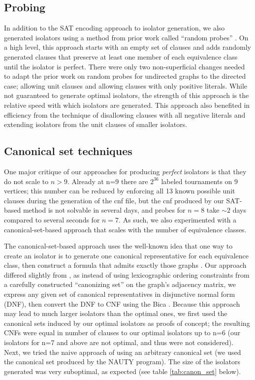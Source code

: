 \documentclass[conference]{IEEEtran}
\begin{document}
\subsection{Probing}
In addition to the SAT encoding approach to isolator generation, we also generated isolators using a method from prior work called ``random probes''  \cite{ref_heule}. On a high level, this approach starts with an empty set of clauses and adds randomly generated clauses that preserve at least one member of each equivalence class until the isolator is perfect.  There were only two non-superficial changes needed to adapt the prior work on random probes for undirected graphs to the directed case; allowing unit clauses and allowing clauses with only positive literals. While not guaranteed to generate optimal isolators, the strength of this approach is the relative speed with which isolators are generated. This approach also benefited in efficiency from the technique of disallowing clauses with all negative literals and extending isolators from the unit clauses of smaller isolators.

\subsection{Canonical set techniques}
One major critique of our approaches for producing \textit{perfect} isolators is that they do not scale to $n>9$. Already at n=9 there are $2^{36}$ labeled tournaments on $9$ vertices; this number can be reduced by enforcing all 13 known possible unit clauses during the generation of the cnf file, but the cnf produced by our SAT-based method is not solvable in several days, and probes for $n=8$ take $\sim 2$ days compared to several seconds for $n=7$. As such, we also experimented with a canonical-set-based approach that scales with the number of equivalence classes. 

The canonical-set-based approach uses the well-known idea that one way to create an isolator is to generate one canonical representative for each equivalence class, then construct a formula that admits exactly those graphs \cite{ref_canon_set}. Our approach differed slightly from \cite{ref_canon_set}, as instead of using lexicographic ordering constraints from a carefully constructed ``canonizing set'' on the graph's adjacency matrix, we express any given set of canonical representatives in disjunctive normal form (DNF), then convert the DNF to CNF using the Bica \cite{ref_bica}. Because this approach may lead to much larger isolators than the optimal ones, we first used the canonical sets induced by our optimal isolators as proofs of concept; the resulting CNFs were equal in number of clauses to our optimal isolators up to n=6 (our isolators for n=7 and above are not optimal, and thus were not considered). Next, we tried the naive approach of using an arbitrary canonical set (we used the canonical set produced by the NAUTY \cite{ref_nauty} program). The size of the isolators generated was very suboptimal, as expected (see table \ref{tab:canon_set} below).
\end{document}
